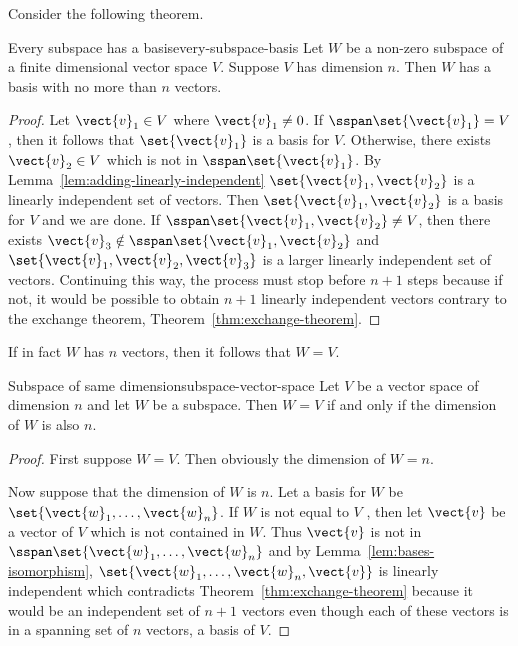 Consider the following theorem.

\begin{theorem}{Every subspace has a basis}{every-subspace-basis}
Let $W$ be a non-zero subspace of a finite dimensional vector
space $V$. Suppose $V$ has dimension $n$.
Then $W$ has a basis
with no more than $n$ vectors.
\end{theorem}

\begin{proof}
Let $\vect{v}_{1}\in V$ where $\vect{v}_{1}\neq 0$. If $
\sspan\set{\vect{v}_{1}} =V$, then it follows that $\set{\vect{v}
_{1}} $ is a basis for $V$. Otherwise, there exists $\vect{v}
_{2}\in V$ which is not in $\sspan\set{\vect{v}_{1}}$. By
Lemma~\ref{lem:adding-linearly-independent} $\set{\vect{v}_{1},\vect{v}_{2}} $ is a
linearly independent set of vectors. Then $\set{\vect{v}_{1},\vect{v}
_{2}} $ is a basis for $V$ and we are done. If $\sspan\set{\vect{v}_{1},
\vect{v}_{2}} \neq V$, then there exists $\vect{v}_{3}\notin \sspan\set{\vect{v}_{1},\vect{v}_{2}} $ and $\set{\vect{v}
_{1},\vect{v}_{2},\vect{v}_{3}} $ is a larger linearly
independent set of vectors. Continuing this way, the process must stop
before $n+1$ steps because if not, it would be possible to obtain $n+1$
linearly independent vectors contrary to the exchange theorem, Theorem~\ref{thm:exchange-theorem}.
\end{proof}

If in fact $W$ has $n$ vectors, then it follows that $W=V$.

\begin{theorem}{Subspace of same dimension}{subspace-vector-space}
Let $V$ be a vector space of dimension $n$ and let $W$ be a
subspace. Then $W=V$ if and only if the dimension of $W$ is also $n$.
\end{theorem}

\begin{proof}First suppose $W=V$. Then obviously the dimension of $W=n$.

Now suppose that the dimension of $W$ is $n$. Let a basis for $W$ be $
\set{\vect{w}_{1},\ldots,\vect{w}_{n}}$. If $W$ is not equal to $V$
, then let $\vect{v}$ be a vector of $V$ which is not contained in $W$. Thus $
\vect{v}$ is not in $\sspan\set{\vect{w}_{1},\ldots,\vect{w}
_{n}} $ and by Lemma~\ref{lem:bases-isomorphism}, $\set{\vect{w}_{1},\ldots,\vect{w}_{n},\vect{v}} $ is linearly independent which contradicts
Theorem~\ref{thm:exchange-theorem} because it would be an independent set of $n+1$
vectors even though each of these vectors is in a spanning set of $n$
vectors, a basis of $V$.
\end{proof}

